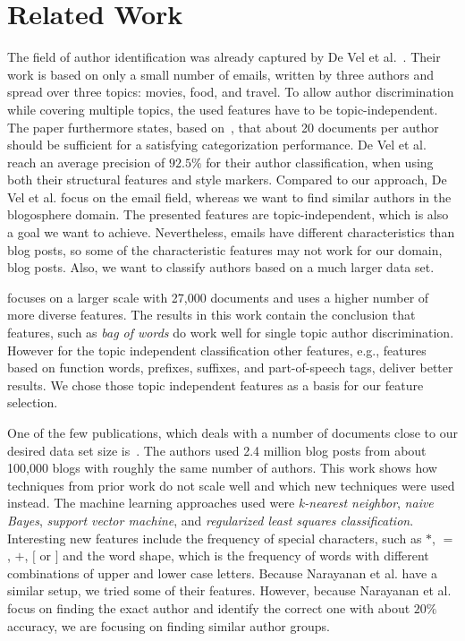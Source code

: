 
\section{Related Work}
\label{sec:related}


The field of author identification was already captured by De Vel et al.~\cite{de2001mining}.
Their work is based on only a small number of emails, written by three authors and spread over three topics: movies, food, and travel.
To allow author discrimination while covering multiple topics, the used features have to be topic-independent.
The paper furthermore states, based on~\cite{corney2001identifying}, that about 20 documents per author should be sufficient for a satisfying categorization performance.
De Vel et al. reach an average precision of $92.5\%$ for their author classification, when using both their structural features and style markers.
Compared to our approach, De Vel et al. focus on the email field, whereas we want to find similar authors in the blogosphere domain.
The presented features are topic-independent, which is also a goal we want to achieve.
Nevertheless, emails have different characteristics than blog posts, so some of the characteristic features may not work for our domain, blog posts.
Also, we want to classify authors based on a much larger data set.


\cite{madigan2005author} focuses on a larger scale with 27,000 documents and uses a higher number of more diverse features.
The results in this work contain the conclusion that features, such as \textit{bag of words} do work well for single topic author discrimination.
However for the topic independent classification other features, e.g., features based on function words, prefixes, suffixes, and part-of-speech tags, deliver better results.
We chose those topic independent features as a basis for our feature selection.


One of the few publications, which deals with a number of documents close to our desired data set size is~\cite{narayanan2012feasibility}.
The authors used 2.4 million blog posts from about 100,000 blogs with roughly the same number of authors.
This work shows how techniques from prior work do not scale well and which new techniques were used instead.
The machine learning approaches used were \textit{k-nearest neighbor}, \textit{naive Bayes}, \textit{support vector machine}, and \textit{regularized least squares classification}.
Interesting new features include the frequency of special characters, such as $*$, $=$, $+$, $[$ or $]$ and the word shape, which is the frequency of words with different combinations of upper and lower case letters.
Because Narayanan et al. have a similar setup, we tried some of their features.
However, because Narayanan et al. focus on finding the exact author and identify the correct one with about $20\%$ accuracy, we are focusing on finding similar author groups.


